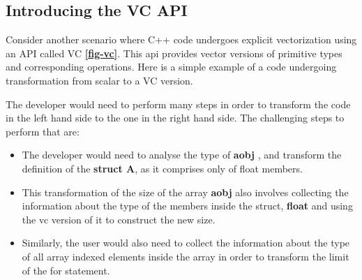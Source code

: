 \documentclass[preprint]{sigplanconf}
\begin{document}
\subsection{Introducing the VC API}
Consider another scenario where C++ code undergoes explicit vectorization using an API called VC \textbf{\ref{fig-vc}}. This api provides vector versions of primitive types and corresponding operations. Here is a simple example of a code undergoing transformation from scalar to a VC version.
\begin{figure*}

\caption{Introducing VC}
\label{fig-vc}
\end{figure*}
The developer would need to perform many steps in order to transform the code in the left hand side to the one in the right hand side. The challenging steps to perform that are:
\begin{itemize}

\item The developer would need to analyse the type of \textbf{aobj} , and transform the definition of the \textbf{struct A}, as it comprises only of float members.
\item This transformation of the size of the array \textbf{aobj} also involves collecting the information about the type of the members inside the struct, \textbf{float} and using the vc version of it to construct the new size. 
\item Similarly, the user would also need to collect the information about the type of all array indexed elements inside the array in order to transform the limit of the for statement. 

\end{itemize}
\end{document}
